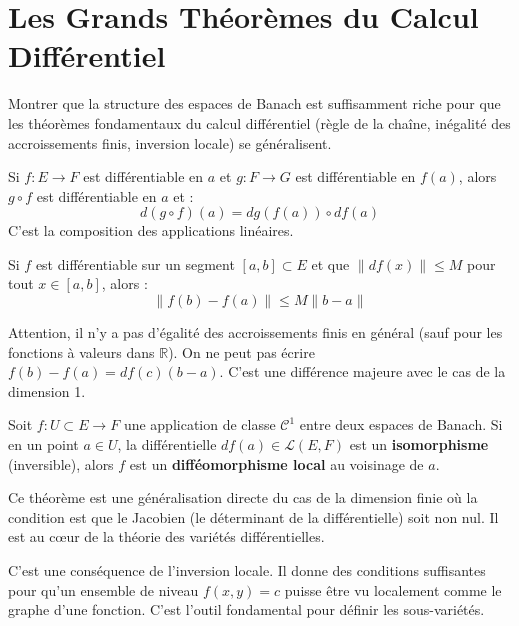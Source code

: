 \section{Les Grands Théorèmes du Calcul Différentiel}

\begin{objectif}
    Montrer que la structure des espaces de Banach est suffisamment riche pour que les théorèmes fondamentaux du calcul différentiel (règle de la chaîne, inégalité des accroissements finis, inversion locale) se généralisent.
\end{objectif}

\begin{theorem}
    Si $f: E \to F$ est différentiable en $a$ et $g: F \to G$ est différentiable en $f(a)$, alors $g \circ f$ est différentiable en $a$ et :
    $$ d(g \circ f)(a) = dg(f(a)) \circ df(a) $$
    C'est la composition des applications linéaires.
\end{theorem}

\begin{theorem}
    Si $f$ est différentiable sur un segment $[a,b] \subset E$ et que $\|df(x)\| \le M$ pour tout $x \in [a,b]$, alors :
    $$ \|f(b)-f(a)\| \le M \|b-a\| $$
\end{theorem}
\begin{remark}
    Attention, il n'y a pas d'égalité des accroissements finis en général (sauf pour les fonctions à valeurs dans $\mathbb{R}$). On ne peut pas écrire $f(b)-f(a) = df(c)(b-a)$. C'est une différence majeure avec le cas de la dimension 1.
\end{remark}

\begin{theorem}
    Soit $f: U \subset E \to F$ une application de classe $\mathcal{C}^1$ entre deux espaces de Banach. Si en un point $a \in U$, la différentielle $df(a) \in \mathcal{L}(E,F)$ est un \textbf{isomorphisme} (inversible), alors $f$ est un \textbf{difféomorphisme local} au voisinage de $a$.
\end{theorem}
\begin{remark}
    Ce théorème est une généralisation directe du cas de la dimension finie où la condition est que le Jacobien (le déterminant de la différentielle) soit non nul. Il est au cœur de la théorie des variétés différentielles.
\end{remark}

\begin{theorem}
    C'est une conséquence de l'inversion locale. Il donne des conditions suffisantes pour qu'un ensemble de niveau $f(x,y)=c$ puisse être vu localement comme le graphe d'une fonction. C'est l'outil fondamental pour définir les sous-variétés.
\end{theorem}

